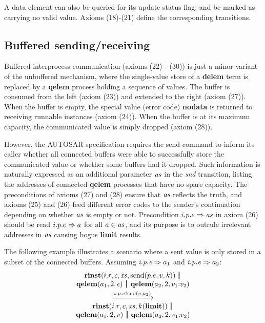 \documentclass[twocolumn]{article}
\begin{document}
A data element can also be queried for its update status flag, and be marked as carrying no valid value. Axioms (18)-(21) define the corresponding transitions.


\subsection{Buffered sending/receiving}

Buffered interprocess communication (axioms (22) - (30)) is just a minor variant of the unbuffered mechanism, where the single-value store of a {\bf delem} term is replaced by a {\bf qelem} process holding a sequence of values. The buffer is consumed from the left (axiom (23)) and extended to the right (axiom (27)). When the buffer is empty, the special value (error code) {\bf nodata} is returned to receiving runnable instances (axiom (24)). When the buffer is at its maximum capacity, the communicated value is simply dropped (axiom (28)).

However, the AUTOSAR specification requires the send command to inform its caller whether all connected buffers were able to successfully store the communicated value or whether some buffers had it dropped. Such information is naturally expressed as an additional parameter $\Tvar{as}$ in the {\em snd} transition, listing the addresses of connected {\bf qelem} processes that have no spare capacity. The preconditions of axioms (27) and (28) ensure that $\Tvar{as}$ reflects the truth, and axioms (25) and (26) feed different error codes to the sender's continuation depending on whether $\Tvar{as}$ is empty or not. Precondition $\Tconnect {i.p.e} \Tvar{as}$ in axiom (26) should be read $\Tconnect {i.p.e} a$ for all $a \in \Tvar{as}$, and its purpose is to outrule irrelevant addresses in $\Tvar{as}$ causing bogus {\bf limit} results.

The following example illustrates a scenario where a sent value is only stored in a subset of the connected buffers. Assuming $\Tconnect {\Tep e p i} {a_1}$ and $\Tconnect {\Tep e p i} {a_2}$:
$$
\begin{array}{c}
	\Trinst {i.r} c \Xs {\TrteSend {p.e} v k} \,\Opar  \\
	{\Tqelem {a_1} 2 \Teps} \Opar {\Tqelem {a_2} 2 {\Tcons {v_1} {v_2}}} \vspace{0.6ex} \\
	\red{\say{i.p.e}{\Tsnd v {a_2}}} \\
	\Trinst {i.r} c \Xs {\Tap k \Tlimit} \,\Opar \\
	{\Tqelem {a_1} 2 v} \Opar {\Tqelem {a_2} 2 {\Tcons {v_1} {v_2}}}
\end{array}
$$
\end{document}
